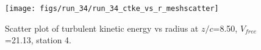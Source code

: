 \begin{figure}[H]
\centering
\texttt{[image: figs/run\_34/run\_34\_ctke\_vs\_r\_meshscatter]}
\caption{Scatter plot of turbulent kinetic energy vs radius at $z/c$=8.50, $V_{free}$=21.13, station 4.}
\label{fig:run_34_ctke_vs_r_meshscatter}
\end{figure}


